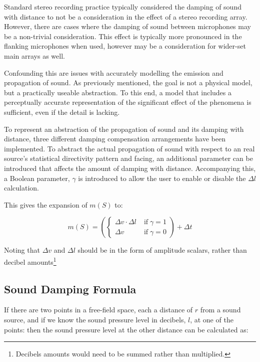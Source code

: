 Standard stereo recording practice typically considered the damping of sound with distance to not be a consideration in the effect of a stereo recording array. However, there are cases where the damping of sound between microphones may be a non-trivial consideration. This effect is typically more pronounced in the flanking microphones when used, however may be a consideration for wider-set main arrays as well.

Confounding this are issues with accurately modelling the emission and propagation of sound. As previously mentioned, the goal is not a physical model, but a practically useable abstraction. To this end, a model that includes a perceptually accurate representation of the significant effect of the phenomena is sufficient, even if the detail is lacking.

To represent an abstraction of the propagation of sound and its damping with distance, three different damping compensation arrangements have been implemented. To abstract the actual propagation of sound with respect to an real source's statistical directivity pattern and facing, an additional parameter can be introduced that affects the amount of damping with distance. Accompanying this, a Boolean parameter, $\gamma$ is introduced to allow the user to enable or disable the $\Delta{l}$ calculation.

This gives the expansion of $m(S)$ to:

\begin{equation}
m(S) = \left(\begin{cases}
\Delta{v} \cdot \Delta{l} & \; \text{if} \; \gamma = 1 \\
\Delta{v} &\; \text{if} \; \gamma = 0
\end{cases}\right)
+ \Delta{t}
\end{equation}

Noting that $\Delta{v}$ and $\Delta{l}$ should be in the form of amplitude scalars, rather than decibel amounts\footnote{Decibels amounts would need to be summed rather than multiplied.}

\subsection {Sound Damping Formula}

If there are two points in a free-field space, each a distance of $r$ from a sound source, and if we know the sound pressure level in decibels, $l$, at one of the points: then the sound pressure level at the other distance can be calculated as:

